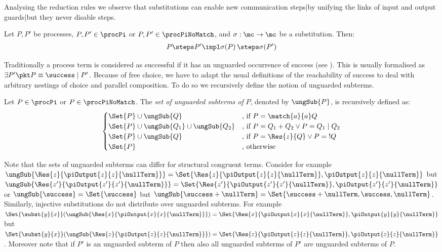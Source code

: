 \documentclass[]{article}
\begin{document}
Analysing the reduction rules we observe that substitutions can enable new communication steps|by unifying the links of input and output guards|but they never disable steps.

\begin{obs}
	\label{obs:subsSteps}
	Let $ P, P' $ be processes, \ie $ P, P' \in \procPi $ or $ P, P' \in \procPiNoMatch $, and $ \sigma : \mc \to \mc $ be a substitution.
	Then:
	\begin{align*}
		P \steps P' \impl \sigma\!\left( P \right) \steps \sigma\!\left( P' \right)
	\end{align*}
\end{obs}

Traditionally a process term is considered as successful if it has an unguarded occurrence of success (see \eg \cite{gorla}). This is usually formalised as $ \exists P' \pkt P \equiv \success \mid P' $. Because of free choice, we have to adapt the usual definitions of the reachability of success to deal with arbitrary nestings of choice and parallel composition. To do so we recursively define the notion of unguarded subterms.

\begin{definition}
	\label{def:unguardedSubterms}
	Let $ P \in \procPi $ or $ P \in \procPiNoMatch $. The \emph{set of unguarded subterms of} $ P $, denoted by $ \ungSub{P} $, is recursively defined as:
	\vspace*{-0.6em}
	\begin{align*}
  		\begin{cases}
  			\Set{ P } \cup \ungSub{Q} & \text{, if } P = \match{a}{a}Q\\
  			\Set{ P } \cup \ungSub{Q_1} \cup \ungSub{Q_2} & \text{, if } P = Q_1 + Q_2 \vee P = Q_1 \mid Q_2\\
  			\Set{ P } \cup \ungSub{Q} & \text{, if } P = \Res{z}{Q} \vee P = {!}Q\\
  			\Set{ P } & \text{, otherwise}
  		\end{cases}
	\end{align*}
	\vspace*{-1.1em}
\end{definition}

\noindent
Note that the sets of unguarded subterms can differ for structural congruent terms. Consider for example $ \ungSub{\Res{z}{\piOutput{z}{z}{\nullTerm}}} = \Set{ \Res{z}{\piOutput{z}{z}{\nullTerm}}, \piOutput{z}{z}{\nullTerm} } $ but $ \ungSub{\Res{z'}{\piOutput{z'}{z'}{\nullTerm}}} = \Set{ \Res{z'}{\piOutput{z'}{z'}{\nullTerm}}, \piOutput{z'}{z'}{\nullTerm} } $
or $ \ungSub{\success} = \Set{ \success } $ but $ \ungSub{\success + \nullTerm} = \Set{ \success + \nullTerm, \success, \nullTerm } $.
Similarly, injective substitutions do not distribute over unguarded subterms.
For example $ \Set{ \subst{y}{x} }\!\left( \ungSub{\Res{x}{\piOutput{x}{x}{\nullTerm}}} \right) = \Set{ \Res{x}{\piOutput{x}{x}{\nullTerm}}, \piOutput{y}{y}{\nullTerm} } $ but $ \Set{ \subst{y}{x} }\!\left( \ungSub{\Res{z}{\piOutput{z}{z}{\nullTerm}}} \right) = \Set{ \Res{z}{\piOutput{z}{z}{\nullTerm}}, \piOutput{z}{z}{\nullTerm} } $.
Moreover note that if $ P' $ is an unguarded subterm of $ P $ then also all unguarded subterms of $ P' $ are unguarded subterms of $ P $.
\end{document}
